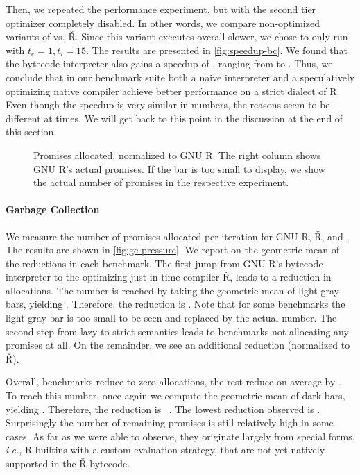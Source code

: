 \documentclass[screen,acmsmall]{acmart}
\renewcommand{\Rsh}{{\sf\v R}\xspace}
\newcommand{\ie}{\emph{i.e.},\xspace}
\begin{document}
Then, we repeated the performance experiment, but with the second tier optimizer
completely disabled. In other words, we compare non-optimized variants of
\rshstrict vs. \Rsh. Since this variant executes overall \rshBCSlowdown slower,
we chose to only run with $t_e = 1, t_i = 15$. The results are presented in
\autoref{fig:speedup-bc}. We found that the bytecode interpreter also gains a
speedup of \speedupBCRshStrict, ranging from \speedupBCRshStrictMin to
\speedupBCRshStrictMax.
%
Thus, we conclude that in our benchmark suite both a naive interpreter and a
speculatively optimizing native compiler achieve better performance on a strict
dialect of R. Even though the speedup is very similar in numbers, the reasons
seem to be different at times. We will get back to this point in the discussion
at the end of this section.


\begin{figure}[h]
  \centering
  
  \caption{Promises allocated, normalized to GNU R. The right column shows GNU R's actual promises. If the bar is too small to display, we show the actual number of promises in the respective experiment.}
  \label{fig:gc-pressure}
\end{figure}

\paragraph{Garbage Collection}
We measure the number of promises allocated per iteration for GNU R, \Rsh, and
\rshstrict. The results are shown in \autoref{fig:gc-pressure}. We report on the
geometric mean of the reductions in each benchmark. The first jump from GNU R's
bytecode interpreter to the optimizing just-in-time compiler \Rsh, leads to a
\promiseAlocationReductionGnurRsh reduction in allocations. The number is
reached by taking the geometric mean of light-gray bars, yielding
\promiseAllocationGnurRsh. Therefore, the reduction is
\promiseAlocationReductionGnurRsh. Note that for some benchmarks the light-gray bar is
too small to be seen and replaced by the actual number. The second step from
lazy to strict semantics leads to \promiseAlocationReductionRshStrictToZero
benchmarks not allocating any promises at all. On the remainder, we see an
additional \promiseAlocationReductionRshStrict reduction (\rshstrict normalized
to \Rsh).

Overall, \promiseAlocationReductionRshStrictToZero benchmarks reduce to zero
allocations, the rest reduce on average by
\promiseAlocationReductionGnurRshStrict. To reach this number, once again we
compute the geometric mean of dark bars, yielding
\promiseAllocatioGnurRshStrict. Therefore, the reduction is
~\promiseAlocationReductionGnurRshStrict.
The lowest reduction observed is \promiseAlocationReductionGnurRshStrictMin.
Surprisingly the number of remaining promises is still relatively high in some
cases. As far as we were able to observe, they originate largely from special
forms, \ie R builtins with a custom evaluation strategy, that are not yet
natively supported in the \Rsh bytecode.
\end{document}

